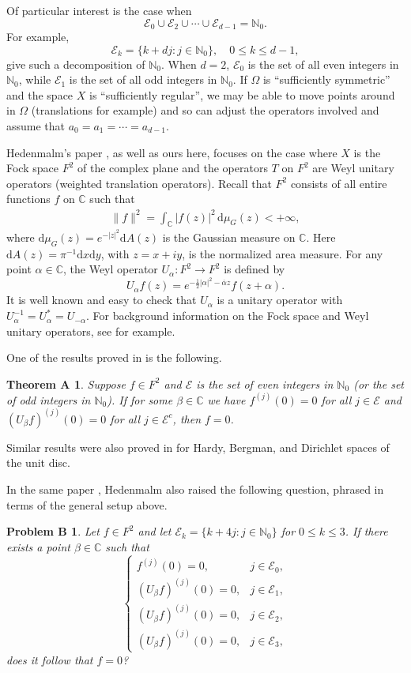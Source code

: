 \documentclass[reqno,11pt]{amsart}
\newtheorem*{theorema*}{Theorem A}
\newtheorem*{problemb*}{Problem B}
\newcommand{\C}{\mathbb C}
\newcommand{\E}{\mathcal E}
\newcommand{\N}{\mathbb N}
\begin{document}
Of particular interest is the case when
$$\E_0\cup \E_2\cup\cdots\cup \E_{d-1}=\N_0.$$
For example,
$$\E_k=\{k+dj: j\in\N_0\},\quad 0\le k\le d-1,$$
give such a decomposition of $\N_0$. When $d=2$, $\E_0$ is the set of all
even integers in $\N_0$, while $\E_1$ is the set of all odd integers in $\N_0$.
If $\Omega$ is ``sufficiently symmetric'' and the space $X$ is ``sufficiently 
regular'', we may be able to move points around in $\Omega$ 
(translations for example) and so can adjust the operators involved and 
assume that  $a_0=a_1=\cdots=a_{d-1}$.

Hedenmalm's paper \cite{Hed2025}, as well as ours here, focuses on the case 
where $X$ is the Fock space $F^2$ of the complex plane and the operators $T$ 
on $F^2$ are Weyl unitary operators (weighted translation operators). Recall that 
$F^2$ consists of all entire functions $f$ on $\C$ such that
\begin{align*}
\|f\|^2=\int_{\C}|f(z)|^{2}\,\mathrm{d}\mu_{G}(z)<+\infty,
\end{align*}
where $\mathrm{d}\mu_G(z)=e^{-|z|^{2}}\mathrm{d}A(z)$ is the Gaussian
measure on $\C$. Here $\mathrm{d}A(z)=\pi^{-1}\mathrm{d}x\mathrm{d}y$, 
with $z = x + iy$, is the normalized area measure. For any point $\alpha\in\C$, 
the Weyl operator $U_\alpha: F^2\to F^2$ is defined by
$$U_\alpha f(z)=e^{-\frac12|\alpha|^2-\overline\alpha z}f(z+\alpha).$$
It is well known and easy to check that $U_\alpha$ is a unitary operator with
$U_\alpha^{-1}=U_\alpha^*=U_{-\alpha}$. For background information 
on the Fock space and Weyl unitary operators, see \cite{Zhu2012} for example.

One of the results proved in \cite{Hed2025} is the following.

\begin{theorema*}
Suppose $f\in F^2$ and $\E$ is the set of even integers in $\N_0$ 
(or the set of odd integers in $\N_0$). If for some $\beta\in\C$ we 
have $f^{(j)}(0)=0$ for all $j\in\E$ and 
$(U_\beta f)^{(j)}(0)=0$ for all $j\in\E^c$, then $f=0$.
\end{theorema*}

Similar results were also proved in \cite{MR2023} for Hardy, Bergman, 
and Dirichlet spaces of the unit disc.

In the same paper \cite{Hed2025}, Hedenmalm also raised the following
question, phrased in terms of the general setup above.

\begin{problemb*} 
Let $f\in F^2$ and let $\E_k=\{k+4j: j\in\N_0\}$ for $0\le k\le 3$. If there
exists a point $\beta\in\C$ such that
\begin{equation}
\begin{cases}
f^{(j)}(0)=0, &j\in\E_0,\\
(U_\beta f)^{(j)}(0)=0, &j\in\E_1,\\
(U_\beta f)^{(j)}(0)=0, &j\in\E_2,\\
(U_\beta f)^{(j)}(0)=0, &j\in\E_3,\end{cases}
\end{equation}
does it follow that $f=0$?
\end{problemb*}
\end{document}
